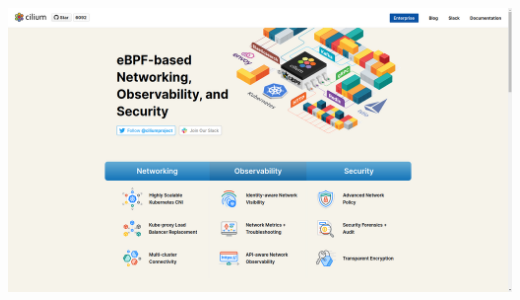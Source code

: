 \documentclass[black,white,aspectratio=169]{beamer}
\DeclareRobustCommand{\#}{\adjustbox{valign=B,totalheight=.57\baselineskip}{\oldhash}}%
\begin{document}
    {
        \usebackgroundtemplate%
        {%
          \includegraphics[width=\paperwidth,height=\paperheight]{cilium.png}%
        }
        \begin{frame}
        \end{frame}
    }
\end{document}
